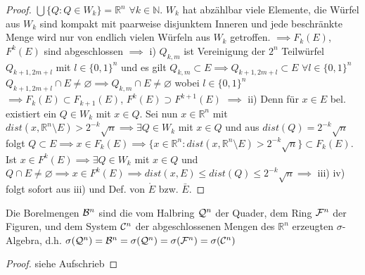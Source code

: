   \begin{proof}
    $\bigcup\{Q:Q\in W_k\} = \mathbb{R}^n$ $\forall k\in\mathbb{N}$. \newline
    $W_k$ hat abzählbar viele Elemente, die Würfel aus $W_k$ sind kompakt mit paarweise disjunktem Inneren und jede beschränkte Menge wird nur von endlich vielen Würfeln aus $W_k$ getroffen. $\implies F_k(E)$, $F^k(E)$ sind abgeschlossen $\implies$ i) \newline
    $Q_{k,m}$ ist Vereinigung der $2^n$ Teilwürfel $Q_{k+1, 2m+l}$ mit $l\in \{0,1\}^n$ und es gilt \newline $Q_{k,m} \subset E \implies Q_{k+1, 2m+l} \subset E$ $\forall l\in\{0,1\}^n$ \newline
    $Q_{k+1,2m+l} \cap E \neq \varnothing \implies Q_{k,m} \cap E \neq \varnothing$ wobei $l\in\{0,1\}^n$ \newline
    $\implies F_k(E) \subset F_{k+1}(E)$, $F^k(E) \supset F^{k+1}(E)$ $\implies$ ii) \newline
    Denn für $x \in E$ bel. existiert ein $Q\in W_k$ mit $x\in Q$. \newline
    Sei nun $x\in\mathbb{R}^n$ mit $dist(x,\mathbb{R}^n\setminus E) > 2^{-k}\sqrt{n} \implies \exists Q\in W_k$ mit $x\in Q$ und aus $dist(Q) = 2^{-k}\sqrt{n}$ folgt $Q\subset E \implies x\in F_k(E)\implies \{x\in\mathbb{R}^n: dist(x,\mathbb{R}^n\setminus E) > 2^{-k}\sqrt{n}\} \subset F_k(E)$. \newline
    Ist $x\in F^k(E) \implies \exists Q\in W_k$ mit $x\in Q$ und $Q \cap E \neq \varnothing \implies x\in F^k(E) \implies dist(x,E) \leq dist(Q) \leq 2^{-k}\sqrt{n} \implies$ iii) \newline
    iv) folgt sofort aus iii) und Def. von $\mathring{E}$ bzw. $\bar{E}$. 
    
  \end{proof}


  \begin{lemma}
    Die Borelmengen $\mathcal{B}^n$ sind die vom Halbring $\mathcal{Q}^n$ der Quader, dem Ring $\mathcal{F}^n$ der Figuren, und dem System $\mathcal{C}^n$ der abgeschlossenen Mengen des $\mathbb{R}^n$ erzeugten $\sigma$-Algebra, d.h. $\sigma(\mathcal{Q}^n) = \mathcal{B}^n = \sigma(\mathcal{Q}^n) = \sigma(\mathcal{F}^n) = \sigma(\mathcal{C}^n)$
  \end{lemma}

  \begin{proof}
    siehe Aufschrieb
  \end{proof}

